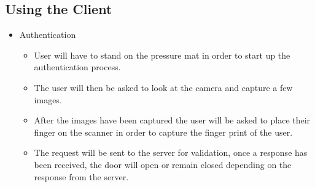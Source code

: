 \subsection{Using the Client}
	\begin{itemize}
		\item Authentication
			\begin{itemize}
				\item User will have to stand on the pressure mat in order to start up the authentication process.
				\item The user will then be asked to look at the camera and capture a few images.
				\item After the images have been captured the user will be asked to place their finger on the scanner in order to capture the finger print of the user.
				\item The request will be sent to the server for validation, once a response has been received, the door will open or remain closed depending on the response from the server.
			\end{itemize}
	\end{itemize}